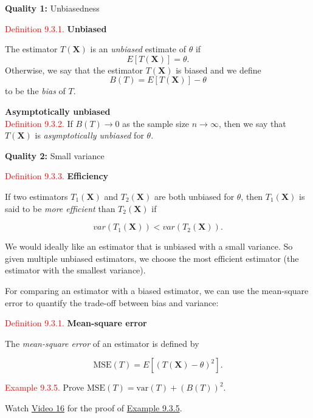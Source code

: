 \documentclass[
]{book}
\begin{document}
{\textbf{Quality 1:} Unbiasedness}

\leavevmode{}%
\textcolor{red}{Definition 9.3.1.}
{\textbf{Unbiased}}

The estimator \(T(\mathbf{X})\) is an \emph{unbiased} estimate of \(\theta\) if
\[E \left[ T(\mathbf{X}) \right] = \theta.\]
Otherwise, we say that the estimator \(T(\mathbf{X})\) is biased and we define \[B(T) = E \left[  T(\mathbf{X}) \right] - \theta\] to be the \emph{bias} of \(T\).

\leavevmode{}%
{\textbf{Asymptotically unbiased}}\\
\textcolor{red}{Definition 9.3.2.}
If \(B(T) \rightarrow 0\) as the sample size \(n \rightarrow \infty\), then we say that \(T(\mathbf{X})\) is \emph{asymptotically unbiased} for \(\theta\).

{\textbf{Quality 2:} Small variance}

\leavevmode{}%
\textcolor{red}{Definition 9.3.3.}
{\textbf{Efficiency}}

If two estimators \(T_1(\mathbf{X})\) and \(T_2(\mathbf{X})\) are both unbiased for \(\theta\), then \(T_1(\mathbf{X})\) is said to be \emph{more efficient} than \(T_2(\mathbf{X})\) if

\[var \left( T_1(\mathbf{X}) \right) < var \left( T_2(\mathbf{X}) \right).\]

We would ideally like an estimator that is unbiased with a small variance. So given multiple unbiased estimators, we choose the most efficient estimator (the estimator with the smallest variance).

For comparing an estimator with a biased estimator, we can use the mean-square error to quantify the trade-off between bias and variance:

\leavevmode{}%
\textcolor{red}{Definition 9.3.1.}
{\textbf{Mean-square error}}

The \emph{mean-square error} of an estimator is defined by

\[\text{MSE}(T) = E \left[ \left( T(\mathbf{X}) - \theta \right) ^2 \right].\]

\leavevmode{}%
\textcolor{red}{Example 9.3.5.}
Prove \(\text{MSE}(T) = \text{var} (T) + \left( B(T) \right)^2\).

Watch \protect\hyperlink{video16}{Video 16} for the proof of \protect\hyperlink{paraesimate:exer:MSE}{Example 9.3.5}.
\end{document}
